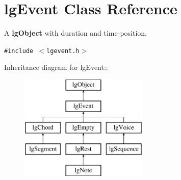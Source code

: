 \section{lg\-Event Class Reference}
\label{classlgEvent}
A {\bf lg\-Object} with duration and time-position.  


{\tt \#include $<$lgevent.h$>$}

Inheritance diagram for lg\-Event::\begin{figure}[H]
\begin{center}
\leavevmode
\includegraphics[height=5cm]{classlgEvent}
\end{center}
\end{figure}

